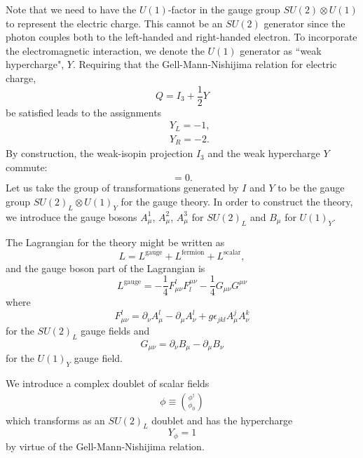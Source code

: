 Note that we need to have the $U(1)$-factor in the gauge group $SU(2)\otimes U(1)$ to represent the electric charge. This cannot be an $SU(2)$ generator since the photon couples both to the left-handed and right-handed electron. To incorporate the electromagnetic interaction, we denote the $U(1)$ generator as ``weak hypercharge", $Y$. Requiring that the Gell-Mann-Nishijima relation for electric charge,
\begin{equation}
Q=I_3+\frac{1}{2}Y
\end{equation}
be satisfied leads to the assignments
\begin{eqnarray}
&&Y_L =-1,\nonumber\\
&&Y_R = -2.
\end{eqnarray}
By construction, the weak-isopin projection $I_3$ and the weak hypercharge $Y$ commute:
\begin{equation}
[I_3,Y]=0.
\end{equation}
Let us take the group of transformations generated by $I$ and $Y$ to be the gauge group $SU(2)_L\otimes U(1)_Y$ for the gauge theory. In order to construct the theory, we introduce the gauge bosons $A_\mu^1$, $A_\mu^2$, $A_\mu^3$ for $SU(2)_L$ and $B_\mu$ for $U(1)_Y$.

The Lagrangian for the theory might be written as
\begin{equation}
L=L^{\text{gauge}}+L^{\text{fermion}}+L^{\text{scalar}},
\end{equation}
and the gauge boson part of the Lagrangian is
\begin{equation}
L^{\text{gauge}}=-\frac{1}{4}F^l_{\mu\nu}F_l^{\mu\nu}-\frac{1}{4}G_{\mu\nu}G^{\mu\nu}
\end{equation}
where 
\begin{equation}
F^l_{\mu\nu}=\partial_\nu A^l_\mu-\partial_\mu A^l_\nu+g\epsilon_{jkl} A^j_{\mu} A^k_{\nu}
\end{equation}
for the $SU(2)_L$ gauge fields and
\begin{equation}
G_{\mu\nu}=\partial_\nu B_\mu -\partial_\mu B_\nu
\end{equation}
for the $U(1)_Y$ gauge field. 

We introduce a complex doublet of scalar fields
\begin{eqnarray}
\phi\equiv\binom{\phi^{\dagger}}{\phi_0}
\end{eqnarray}
which transforms as an $SU(2)_L$ doublet and has the hypercharge 
\begin{equation*}
Y_\phi=1
\end{equation*}
by virtue of the Gell-Mann-Nishijima relation.

